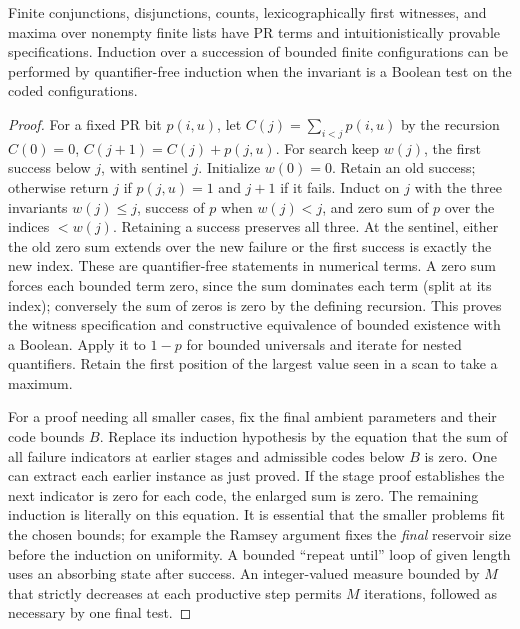 \begin{lemma}\label{result01}\label{lem:search}
Finite conjunctions, disjunctions, counts, lexicographically first witnesses, and maxima over nonempty finite lists have PR terms and intuitionistically provable specifications. Induction over a succession of bounded finite configurations can be performed by quantifier-free induction when the invariant is a Boolean test on the coded configurations.
\end{lemma}
\begin{proof}
For a fixed PR bit $p(i,u)$, let $C(j)=\sum_{i<j}p(i,u)$ by the recursion $C(0)=0$, $C(j+1)=C(j)+p(j,u)$. For search keep $w(j)$, the first success below $j$, with sentinel $j$. Initialize $w(0)=0$. Retain an old success; otherwise return $j$ if $p(j,u)=1$ and $j+1$ if it fails. Induct on $j$ with the three invariants $w(j)\le j$, success of $p$ when $w(j)<j$, and zero sum of $p$ over the indices $<w(j)$. Retaining a success preserves all three. At the sentinel, either the old zero sum extends over the new failure or the first success is exactly the new index. These are quantifier-free statements in numerical terms. A zero sum forces each bounded term zero, since the sum dominates each term (split at its index); conversely the sum of zeros is zero by the defining recursion. This proves the witness specification and constructive equivalence of bounded existence with a Boolean. Apply it to $1-p$ for bounded universals and iterate for nested quantifiers. Retain the first position of the largest value seen in a scan to take a maximum.

For a proof needing all smaller cases, fix the final ambient parameters and their code bounds $B$. Replace its induction hypothesis by the equation that the sum of all failure indicators at earlier stages and admissible codes below $B$ is zero. One can extract each earlier instance as just proved. If the stage proof establishes the next indicator is zero for each code, the enlarged sum is zero. The remaining induction is literally on this equation. It is essential that the smaller problems fit the chosen bounds; for example the Ramsey argument fixes the \emph{final} reservoir size before the induction on uniformity. A bounded ``repeat until'' loop of given length uses an absorbing state after success. An integer-valued measure bounded by $M$ that strictly decreases at each productive step permits $M$ iterations, followed as necessary by one final test.
\end{proof}

